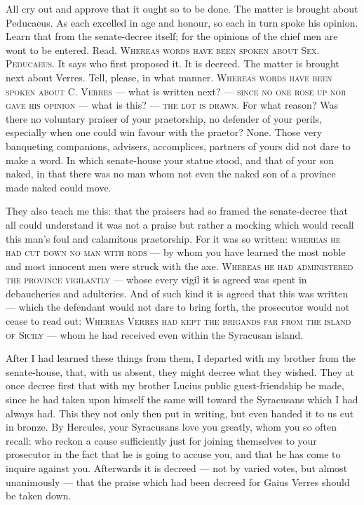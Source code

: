 All cry out and approve that it ought so to be done. The matter is brought about Peducaeus. As each excelled in age and honour, so each in turn spoke his opinion. Learn that from the senate-decree itself; for the opinions of the chief men are wont to be entered. Read. \textsc{Whereas words have been spoken about Sex. Peducaeus}. It says who first proposed it. It is decreed. The matter is brought next about Verres. Tell, please, in what manner. \textsc{Whereas words have been spoken about C. Verres} --- what is written next? --- \textsc{since no one rose up nor gave his opinion} --- what is this? --- \textsc{the lot is drawn}. For what reason? Was there no voluntary praiser of your praetorship, no defender of your perils, especially when one could win favour with the praetor? None. Those very banqueting companions, advisers, accomplices, partners of yours did not dare to make a word. In which senate-house your statue stood, and that of your son naked, in that there was no man whom not even the naked son of a province made naked could move.

 They also teach me this: that the praisers had so framed the senate-decree that all could understand it was not a praise but rather a mocking which would recall this man's foul and calamitous praetorship. For it was so written: \textsc{whereas he had cut down no man with rods} --- by whom you have learned the most noble and most innocent men were struck with the axe. \textsc{Whereas he had administered the province vigilantly} --- whose every vigil it is agreed was spent in debaucheries and adulteries. And of such kind it is agreed that this was written --- which the defendant would not dare to bring forth, the prosecutor would not cease to read out: \textsc{Whereas Verres had kept the brigands far from the island of Sicily} --- whom he had received even within the Syracusan island.

 After I had learned these things from them, I departed with my brother from the senate-house, that, with us absent, they might decree what they wished. They at once decree first that with my brother Lucius public guest-friendship be made, since he had taken upon himself the same will toward the Syracusans which I had always had. This they not only then put in writing, but even handed it to us cut in bronze. By Hercules, your Syracusans love you greatly, whom you so often recall: who reckon a cause sufficiently just for joining themselves to your prosecutor in the fact that he is going to accuse you, and that he has come to inquire against you. Afterwards it is decreed --- not by varied votes, but almost unanimously --- that the praise which had been decreed for Gaius Verres should be taken down.

